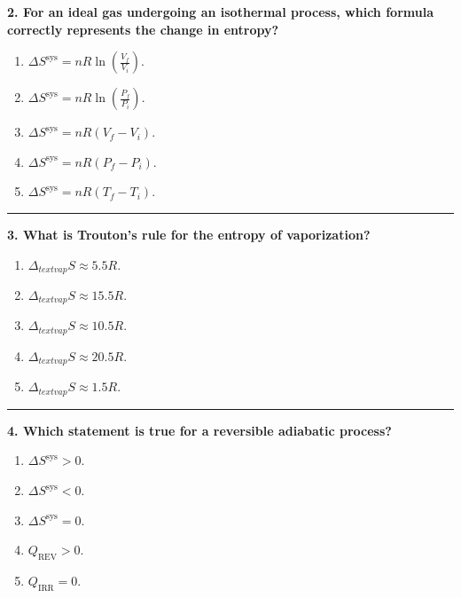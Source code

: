 \documentclass[
  9pt,
]{extbook}
\providecommand{\tightlist}{%
  \setlength{\itemsep}{0pt}\setlength{\parskip}{0pt}}
\theoremstyle{definition}
\theoremstyle{definition}
\theoremstyle{definition}
\theoremstyle{definition}
\theoremstyle{remark}
\begin{document}
\textbf{2. For an ideal gas undergoing an isothermal process, which formula correctly represents the change in entropy?}

\begin{enumerate}
\def\labelenumi{\alph{enumi}.}
\tightlist
\item
  \(\Delta S^{\text{sys}} = nR \ln \left(\frac{V_f}{V_i}\right)\).
\item
  \(\Delta S^{\text{sys}} = nR \ln \left(\frac{P_f}{P_i}\right)\).
\item
  \(\Delta S^{\text{sys}} = nR (V_f - V_i)\).
\item
  \(\Delta S^{\text{sys}} = nR (P_f - P_i)\).
\item
  \(\Delta S^{\text{sys}} = nR (T_f - T_i)\).
\end{enumerate}

\begin{center}\rule{0.5\linewidth}{0.5pt}\end{center}

\textbf{3. What is Trouton's rule for the entropy of vaporization?}

\begin{enumerate}
\def\labelenumi{\alph{enumi}.}
\tightlist
\item
  \(\Delta_{text{vap}} S \approx 5.5R\).
\item
  \(\Delta_{text{vap}} S \approx 15.5R\).
\item
  \(\Delta_{text{vap}} S \approx 10.5R\).
\item
  \(\Delta_{text{vap}} S \approx 20.5R\).
\item
  \(\Delta_{text{vap}} S \approx 1.5R\).
\end{enumerate}

\begin{center}\rule{0.5\linewidth}{0.5pt}\end{center}

\textbf{4. Which statement is true for a reversible adiabatic process?}

\begin{enumerate}
\def\labelenumi{\alph{enumi}.}
\tightlist
\item
  \(\Delta S^{\text{sys}} > 0\).
\item
  \(\Delta S^{\text{sys}} < 0\).
\item
  \(\Delta S^{\text{sys}} = 0\).
\item
  \(Q_{\text{REV}} > 0\).
\item
  \(Q_{\text{IRR}} = 0\).
\end{enumerate}
\end{document}

